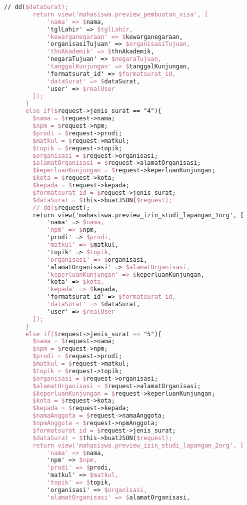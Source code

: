 \begin{lstlisting}[language=tex,basicstyle=\tiny,caption=PesanansuratController.php]
        // dd($dataSurat);
        return view('mahasiswa.preview_pembuatan_visa', [
            'nama' => $nama,
            'tglLahir' => $tglLahir,
            'kewarganegaraan' => $kewarganegaraan,
            'organisasiTujuan' => $organisasiTujuan,
            'thnAkademik' => $thnAkademik,
            'negaraTujuan' => $negaraTujuan,
            'tanggalKunjungan' => $tanggalKunjungan,
            'formatsurat_id' => $formatsurat_id,
            'dataSurat' => $dataSurat,
            'user' => $realUser
        ]);
      }
      else if($request->jenis_surat == "4"){
        $nama = $request->nama;
        $npm = $request->npm;
        $prodi = $request->prodi;
        $matkul = $request->matkul;
        $topik = $request->topik;
        $organisasi = $request->organisasi;
        $alamatOrganisasi = $request->alamatOrganisasi;
        $keperluanKunjungan = $request->keperluanKunjungan;
        $kota = $request->kota;
        $kepada = $request->kepada;
        $formatsurat_id = $request->jenis_surat;
        $dataSurat = $this->buatJSON($request);
        // dd($request);
        return view('mahasiswa.preview_izin_studi_lapangan_1org', [
            'nama' => $nama,
            'npm' => $npm,
            'prodi' => $prodi,
            'matkul' => $matkul,
            'topik' => $topik,
            'organisasi' => $organisasi,
            'alamatOrganisasi' => $alamatOrganisasi,
            'keperluanKunjungan' => $keperluanKunjungan,
            'kota' => $kota,
            'kepada' => $kepada,
            'formatsurat_id' => $formatsurat_id,
            'dataSurat' => $dataSurat,
            'user' => $realUser
        ]);
      }
      else if($request->jenis_surat == "5"){
        $nama = $request->nama;
        $npm = $request->npm;
        $prodi = $request->prodi;
        $matkul = $request->matkul;
        $topik = $request->topik;
        $organisasi = $request->organisasi;
        $alamatOrganisasi = $request->alamatOrganisasi;
        $keperluanKunjungan = $request->keperluanKunjungan;
        $kota = $request->kota;
        $kepada = $request->kepada;
        $namaAnggota = $request->namaAnggota;
        $npmAnggota = $request->npmAnggota;
        $formatsurat_id = $request->jenis_surat;
        $dataSurat = $this->buatJSON($request);
        return view('mahasiswa.preview_izin_studi_lapangan_2org', [
            'nama' => $nama,
            'npm' => $npm,
            'prodi' => $prodi,
            'matkul' => $matkul,
            'topik' => $topik,
            'organisasi' => $organisasi,
            'alamatOrganisasi' => $alamatOrganisasi,

\end{lstlisting}

